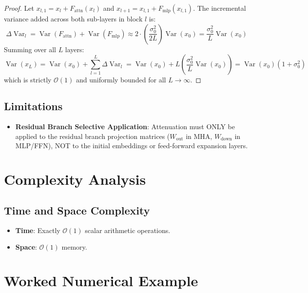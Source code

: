 \documentclass[11pt,a4paper]{article}
\theoremstyle{definition}
\begin{document}
\begin{proof}
Let $x_{l, 1} = x_l + F_{\text{attn}}(x_l)$ and $x_{l+1} = x_{l, 1} + F_{\text{mlp}}(x_{l, 1})$.
The incremental variance added across both sub-layers in block $l$ is:
\begin{equation}
\Delta \operatorname{Var}_l = \operatorname{Var}(F_{\text{attn}}) + \operatorname{Var}(F_{\text{mlp}}) \approx 2 \cdot \left(\frac{\sigma_0^2}{2L}\right) \operatorname{Var}(x_0) = \frac{\sigma_0^2}{L} \operatorname{Var}(x_0)
\end{equation}
Summing over all $L$ layers:
\begin{equation}
\operatorname{Var}(x_L) = \operatorname{Var}(x_0) + \sum_{l=1}^L \Delta \operatorname{Var}_l = \operatorname{Var}(x_0) + L \left(\frac{\sigma_0^2}{L} \operatorname{Var}(x_0)\right) = \operatorname{Var}(x_0)(1 + \sigma_0^2)
\end{equation}
which is strictly $\mathcal{O}(1)$ and uniformly bounded for all $L \to \infty$.
\end{proof}

\subsection{Limitations}
\begin{itemize}
    \item \textbf{Residual Branch Selective Application}: Attenuation must ONLY be applied to the residual branch projection matrices ($W_{\text{out}}$ in MHA, $W_{\text{down}}$ in MLP/FFN), NOT to the initial embeddings or feed-forward expansion layers.
\end{itemize}

\section{Complexity Analysis}

\subsection{Time and Space Complexity}
\begin{itemize}
    \item \textbf{Time}: Exactly $\mathcal{O}(1)$ scalar arithmetic operations.
    \item \textbf{Space}: $\mathcal{O}(1)$ memory.
\end{itemize}

\section{Worked Numerical Example}
\end{document}
